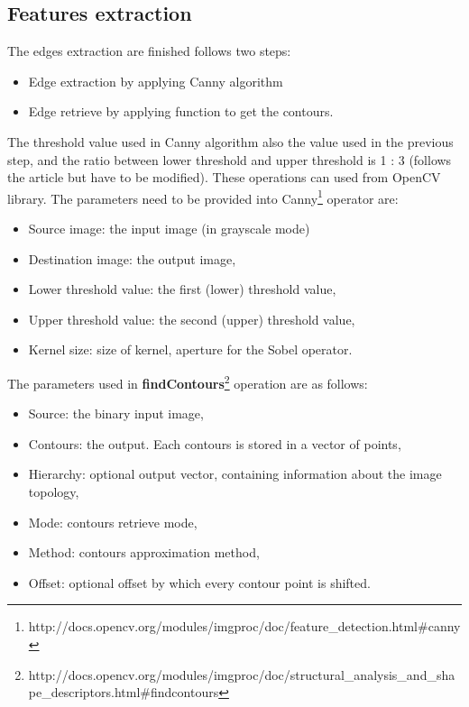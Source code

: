 \subsection{Features extraction}
The edges extraction are finished follows two steps:
\begin{itemize}
\item Edge extraction by applying Canny algorithm
\item Edge retrieve by applying function to get the contours.
\end{itemize} 
The threshold value used in Canny algorithm also the value used in the previous step, and the ratio between lower threshold and upper threshold is 1 : 3 (follows the article \cite{palaniswamy2010automatic} but have to be modified). These operations can used from OpenCV library. The parameters need to be provided into Canny\footnote{http://docs.opencv.org/modules/imgproc/doc/feature\_detection.html\#canny} operator are:
\begin{itemize}
\item Source image: the input image (in grayscale mode)
\item Destination image: the output image,
\item Lower threshold value: the first (lower) threshold value,
\item Upper threshold value: the second (upper) threshold value,
\item Kernel size: size of kernel, aperture for the Sobel operator.
\end{itemize}
The parameters used in \textbf{findContours}\footnote{http://docs.opencv.org/modules/imgproc/doc/structural\_analysis\_and\_shape\_descriptors.html\#findcontours} operation are as follows:
\begin{itemize}
\item Source: the binary input image,
\item Contours: the output. Each contours is stored in a vector of points,
\item Hierarchy: optional output vector, containing information about the image topology,
\item Mode: contours retrieve mode,
\item Method: contours approximation method,
\item Offset: optional offset by which every contour point is shifted.
\end{itemize}
